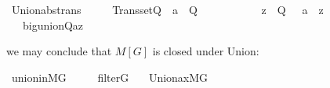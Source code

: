 \begin{isabelle}
\isamarkupfalse%
\ Union{\isacharunderscore}abs{\isacharunderscore}trans\ {\isacharcolon}\ \isanewline
\ \ \ {\isachardoublequoteopen}Transset{\isacharparenleft}Q{\isacharparenright}{\isachardoublequoteclose}\ \ {\isachardoublequoteopen}a\ {\isasymin}\ Q{\isachardoublequoteclose}\ \isanewline
\ \ \ \ \ \ \ \ \ \ {\isachardoublequoteopen}z\ {\isasymin}\ Q{\isachardoublequoteclose}\ \ {\isachardoublequoteopen}{\isasymUnion}\ a\ {\isacharequal}\ z{\isachardoublequoteclose}\isanewline
\ \ \ {\isachardoublequoteopen}big{\isacharunderscore}union{\isacharparenleft}{\isacharhash}{\isacharhash}Q{\isacharcomma}a{\isacharcomma}z{\isacharparenright}{\isachardoublequoteclose}
\end{isabelle}
\noindent we may conclude that $M[G]$ is closed under Union:
\begin{isabelle}
  \isamarkupfalse%
  \ union{\isacharunderscore}in{\isacharunderscore}MG\ {\isacharcolon}\ \isanewline
  \ \ \ {\isachardoublequoteopen}filter{\isacharparenleft}G{\isacharparenright}{\isachardoublequoteclose}\isanewline
\ \ \ {\isachardoublequoteopen}Union{\isacharunderscore}ax{\isacharparenleft}{\isacharhash}{\isacharhash}M{\isacharbrackleft}G{\isacharbrackright}{\isacharparenright}{\isachardoublequoteclose}
\end{isabelle}




